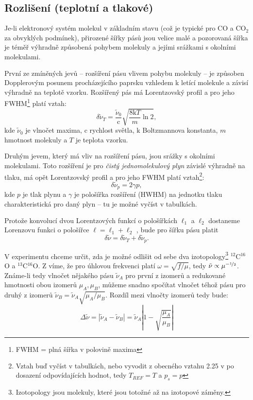 \documentclass[10pt,a4paper]{article}
\newcommand{\°}{\degree}
\begin{document}
\subsection{Rozlišení (teplotní a tlakové)}
Je-li elektronový systém molekul v základním stavu (což je typické pro CO a CO$_2$ za obvyklých podmínek), přirozené šířky pásů jsou velice malé a pozorovaná šířka je téměř výhradně způsobená pohybem molekuly a jejími srážkami s okolními molekulami. \cite{studijni-text}

První ze zmíněných jevů – rozšíření pásu vlivem pohybu molekuly – je způsoben Dopplerovým posunem procházejícího paprsku vzhledem k letící molekule a závisí výhradně na teplotě vzorku. Rozšířený pás má Lorentzovský profil a pro jeho FWHM\footnote{FWHM = plná šířka v polovině maxima} platí vztah:
\begin{equation}
    \delta\tilde\nu_T = \frac{\tilde\nu_0}{\mathrm{c}} \sqrt{\frac{8\mathrm{k}T}{m} \ln 2},
    \label{fwhm-teplota}
\end{equation}
kde $\tilde\nu_0$ je vlnočet maxima, $\mathrm{c}$ rychlost světla, $\mathrm{k}$ Boltzmannova konstanta, $m$ hmotnost molekuly a $T$ je teplota vzorku. \cite{studijni-text}

Druhým jevem, který má vliv na rozšíření pásu, jsou srážky s okolními molekulami. Toto rozšíření je pro \textit{čistý jednomolekulový plyn} závislé výhradně na tlaku, má opět Lorentzovský profil a pro jeho FWHM platí vztah\footnote{Vztah buď vyčíst v tabulkách, nebo vyvodit z obecného vztahu 2.25 v \cite{studijni-text} po dosazení odpovídajících hodnot, tedy $T_{REF} = T$ a $p_s = p$}:
\begin{equation}
    \delta\tilde\nu_p = 2 \gamma p,
    \label{fwhm-tlak}
\end{equation}
kde $p$ je tlak plynu a $\gamma$ je pološířka rozšíření (HWHM) na jednotku tlaku charakteristická pro daný plyn – tu je možné vyčíst v tabulkách.

Protože konvolucí dvou Lorentzových funkcí o pološířkách $\ell_1$ a $\ell_2$ dostaneme Lorenzovu funkci o pološířce $\ell = \ell_1 + \ell_2$ \cite{libretexts:lorentzian-convolution}, bude pro šířku pásu platit
\begin{equation}
    \delta\tilde\nu = \delta\tilde\nu_T + \delta\tilde\nu_p.
    \label{fwhm-total}
\end{equation}

V experimentu chceme určit, zda je možné odlišit od sebe dva izotopology\footnote{Izotopology jsou molekuly, které jsou totožné až na izotopové záměny.} $^{12}$C$^{16}$O a $^{13}$C$^{16}$O. Z \cite{studijni-text} víme, že pro úhlovou frekvenci platí $\omega = \sqrt{f/\mu}$, tedy $\tilde\nu \propto \mu^{-\nicefrac{1}{2}}$. Známe-li tedy vlnočet nějakého pásu $\tilde\nu_A$ pro první z izomerů a redukované hmotnosti obou izomerů $\mu_A, \mu_B$, můžeme snadno spočítat vlnočet téhož pásu pro druhý z izomerů $\tilde\nu_B = \tilde\nu_A \sqrt{\mu_A / \mu_B}$. Rozdíl mezi vlnočty izomerů tedy bude:
\begin{equation}
    \Delta\tilde\nu = |\tilde\nu_A - \tilde\nu_B| = \tilde\nu_A \left|1 - \sqrt{\frac{\mu_A}{\mu_B}}\right|
    \label{rozdil-izotopu}
\end{equation}
\end{document}

